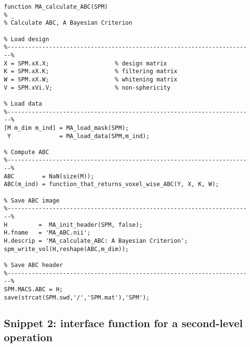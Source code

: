 \documentclass[a4paper,12pt]{article}
\begin{document}
\vspace{1em}
\begin{verbatim}
function MA_calculate_ABC(SPM)
% _
% Calculate ABC, A Bayesian Criterion

% Load design
%-----------------------------------------------------------------------%
X = SPM.xX.X;                   % design matrix
K = SPM.xX.K;                   % filtering matrix
W = SPM.xX.W;                   % whitening matrix
V = SPM.xVi.V;                  % non-sphericity

% Load data
%-----------------------------------------------------------------------%
[M m_dim m_ind] = MA_load_mask(SPM);
 Y              = MA_load_data(SPM,m_ind);

% Compute ABC
%-----------------------------------------------------------------------%
ABC        = NaN(size(M));
ABC(m_ind) = function_that_returns_voxel_wise_ABC(Y, X, K, W);

% Save ABC image
%-----------------------------------------------------------------------%
H         =  MA_init_header(SPM, false);
H.fname   = 'MA_ABC.nii';
H.descrip = 'MA_calculate_ABC: A Bayesian Criterion';
spm_write_vol(H,reshape(ABC,m_dim));

% Save ABC header
%-----------------------------------------------------------------------%
SPM.MACS.ABC = H;
save(strcat(SPM.swd,'/','SPM.mat'),'SPM');
\end{verbatim}


\pagebreak
\subsection*{Snippet 2: interface function for a second-level operation} \label{sec:DEF-inter}
\end{document}
